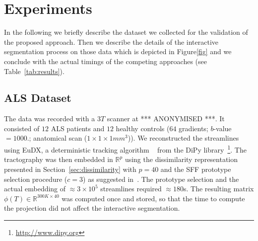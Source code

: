 \section{Experiments}
\label{sec:experiments}
In the following we briefly describe the dataset we collected for the
validation of the proposed approach. Then we describe the details of
the interactive segmentation process on those data which is depicted
in Figure\ref{fig} and we conclude with the actual timings of the
competing approaches (see Table~\ref{tab:results}).

\subsection{ALS Dataset}
\label{sec:dataset}
The data was recorded with a $3T$ scanner at
*** ANONYMISED ***.
It consisted of $12$ ALS patients and $12$ healthy controls ($64$
gradients; $b$-value$=1000$.; anatomical scan ($1 \times 1 \times
1mm^3$)).  We reconstructed the streamlines using EuDX, a
deterministic tracking algorithm ~\cite{garyfallidis2012towards} from
the DiPy library~\footnote{\url{http://www.dipy.org}}. The
tractography was then embedded in $\mathbb{R}^{p}$ using the
dissimilarity representation presented in
Section~\ref{sec:dissimilarity} with $p=40$ and the SFF prototype
selection procedure ($c=3$) as suggested
in~\cite{olivetti2012approximation}. The prototype selection and the
actual embedding of $\approx 3 \times 10^5$ streamlines required
$\approx 180$s. The resulting matrix $\phi(T) \in \mathbb{R}^{300K
  \times 40}$ was computed once and stored, so that the time to
compute the projection did not affect the interactive segmentation.


